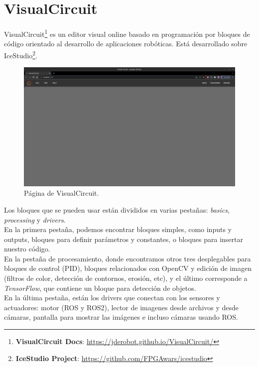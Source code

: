 \section{VisualCircuit}
\label{sec:visualcircuit}

VisualCircuit\footnote{\textbf{VisualCircuit Docs}: \url{https://jderobot.github.io/VisualCircuit/}} es un editor visual online basado en programación por bloques de código orientado al desarrollo de aplicaciones robóticas. Está desarrollado sobre IceStudio\footnote{\textbf{IceStudio Project}: \url{https://github.com/FPGAwars/icestudio}}.\\

\begin{figure} [H]
    \begin{center}
        \includegraphics[width=13cm]{figs/c3/empty_VC.png}
    \end{center}
    \caption[VisualCircuit]{Página de VisualCircuit.}
    \label{fig:VC_empty}
\end{figure}

Los bloques que se pueden usar están divididos en varias pestañas: \textit{basics}, \textit{processing} y \textit{drivers}.\\
En la primera pestaña, podemos encontrar bloques simples, como inputs y outputs, bloques para definir parámetros y constantes, o bloques para insertar nuestro código.\\
En la pestaña de procesamiento, donde encontramos otros tres desplegables para bloques de control (PID), bloques relacionados con OpenCV y edición de imagen (filtros de color, detección de contornos, erosión, etc), y el último corresponde a \textit{TensorFlow}, que contiene un bloque para detección de objetos.\\
En la última pestaña, están los drivers que conectan con los sensores y actuadores: motor (ROS y ROS2), lector de imagenes desde archivos y desde cámaras, pantalla para mostrar las imágenes e incluso cámaras usando ROS.\\

